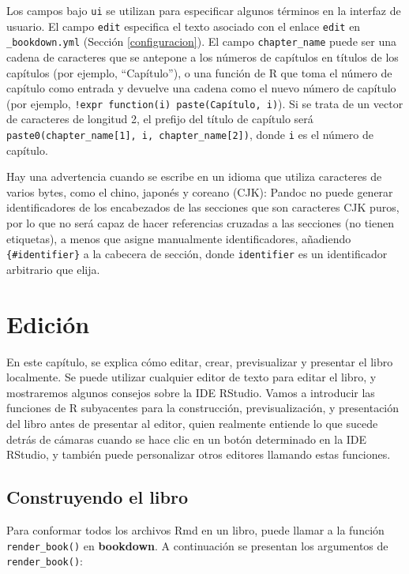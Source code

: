 \documentclass[12pt,]{krantz}
\theoremstyle{definition}
\theoremstyle{definition}
\theoremstyle{definition}
\theoremstyle{remark}
\begin{document}
Los campos bajo \texttt{ui} se utilizan para especificar algunos
términos en la interfaz de usuario. El campo \texttt{edit} especifica el
texto asociado con el enlace \texttt{edit} en \texttt{\_bookdown.yml}
(Sección \ref{configuracion}). El campo \texttt{chapter\_name} puede ser
una cadena de caracteres que se antepone a los números de capítulos en
títulos de los capítulos (por ejemplo, ``Capítulo''), o una función de R
que toma el número de capítulo como entrada y devuelve una cadena como
el nuevo número de capítulo (por ejemplo,
\texttt{!expr\ function(i)\ paste(\textquotesingle{}Capítulo\textquotesingle{},\ i)}).
Si se trata de un vector de caracteres de longitud 2, el prefijo del
título de capítulo será
\texttt{paste0(chapter\_name{[}1{]},\ i,\ chapter\_name{[}2{]})}, donde
\texttt{i} es el número de capítulo.

Hay una advertencia cuando se escribe en un idioma que utiliza
caracteres de varios bytes, como el chino, japonés y coreano (CJK):
Pandoc no puede generar identificadores de los encabezados de las
secciones que son caracteres CJK puros, por lo que no será capaz de
hacer referencias cruzadas a las secciones (no tienen etiquetas), a
menos que asigne manualmente identificadores, añadiendo
\texttt{\{\#identifier\}} a la cabecera de sección, donde
\texttt{identifier} es un identificador arbitrario que elija.

\chapter{Edición}\label{edicion}

En este capítulo, se explica cómo editar, crear, previsualizar y
presentar el libro localmente. Se puede utilizar cualquier editor de
texto para editar el libro, y mostraremos algunos consejos sobre la IDE
RStudio. Vamos a introducir las funciones de R subyacentes para la
construcción, previsualización, y presentación del libro antes de
presentar al editor, quien realmente entiende lo que sucede detrás de
cámaras cuando se hace clic en un botón determinado en la IDE RStudio, y
también puede personalizar otros editores llamando estas funciones.

\section{Construyendo el libro}\label{construyendo-el-libro}

Para conformar todos los archivos Rmd en un libro, puede llamar a la
función \texttt{render\_book()} en \textbf{bookdown}. A continuación se
presentan los argumentos de \texttt{render\_book()}:
\end{document}
